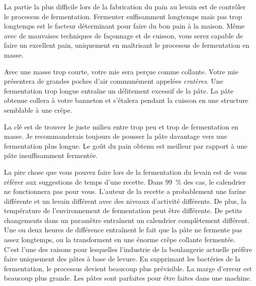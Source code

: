 La partie la plus difficile lors de la fabrication du pain au levain est de contrôler le processus de fermentation. Fermenter suffisamment longtemps mais pas trop longtemps est le facteur déterminant pour faire du bon pain à la maison. Même avec de mauvaises techniques de façonnage et de cuisson, vous serez capable de faire un excellent pain, uniquement en maîtrisant le processus de fermentation en masse.

Avec une masse trop courte, votre mie sera perçue comme collante. Votre mie présentera de grandes poches d'air communément appelées \emph{cratères}. Une fermentation trop longue entraîne un délitement excessif de la pâte. La pâte obtenue collera à votre banneton et s'étalera pendant la cuisson en une structure semblable à une crêpe.

La clé est de trouver le juste milieu entre trop peu et trop de fermentation en masse. Je recommanderais toujours de pousser la pâte davantage vers une fermentation plus longue. Le goût du pain obtenu est meilleur par rapport à une pâte insuffisamment fermentée.

La pire chose que vous pouvez faire lors de la fermentation du levain est de vous référer aux suggestions de temps d'une recette. Dans \qty{99}{\percent} des cas, le calendrier ne fonctionnera pas pour vous. L'auteur de la recette a probablement une farine différente et un levain différent avec des niveaux d'activité différents. De plus, la température de l'environnement de fermentation peut être différente. De petits changements dans un paramètre entraînent un calendrier complètement différent. Une ou deux heures de différence entraînent le fait que la pâte ne fermente pas assez longtemps, ou la transforment en une énorme crêpe collante fermentée. C'est l'une des raisons pour lesquelles l'industrie de la boulangerie actuelle préfère faire uniquement des pâtes à base de levure. En supprimant les bactéries de la fermentation, le processus devient beaucoup plus prévisible. La marge d'erreur est beaucoup plus grande. Les pâtes sont parfaites pour être faites dans une machine.

